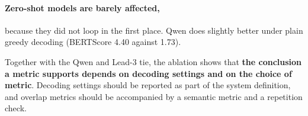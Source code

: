 \paragraph{Zero-shot models are barely affected,} because they did not loop in the first place. Qwen does slightly better under plain greedy decoding (BERTScore 4.40 against 1.73).

Together with the Qwen and Lead-3 tie, the ablation shows that \textbf{the conclusion a metric supports depends on decoding settings and on the choice of metric}. Decoding settings should be reported as part of the system definition, and overlap metrics should be accompanied by a semantic metric and a repetition check.

